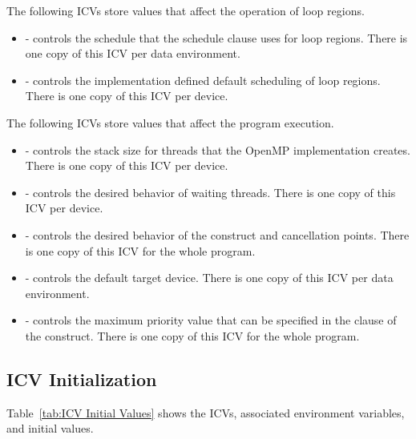 The following ICVs store values that affect the operation of loop regions.

\begin{itemize}
\item {} - controls the schedule that the  schedule clause uses for 
loop regions. There is one copy of this ICV per data environment.

\item {} - controls the implementation defined default scheduling of loop 
regions. There is one copy of this ICV per device. 
\end{itemize}

The following ICVs store values that affect the program execution.

\begin{itemize}
\item {} - controls the stack size for threads that the OpenMP implementation 
creates. There is one copy of this ICV per device. 

\item {} - controls the desired behavior of waiting threads. There is one copy 
of this ICV per device. 

\item {} - controls the desired behavior of the  construct and cancellation 
points. There is one copy of this ICV for the whole program.

\item {} - controls the default target device. There is one copy of this ICV 
per data environment.

\item {} - controls the maximum priority value that can be specified in the
 clause of the  construct. There is one copy of this ICV for the whole program.

\end{itemize}






\subsection{ICV Initialization}
\label{subsec:ICV Initialization}
Table~\ref{tab:ICV Initial Values} shows the ICVs, associated 
environment variables, and initial values.

